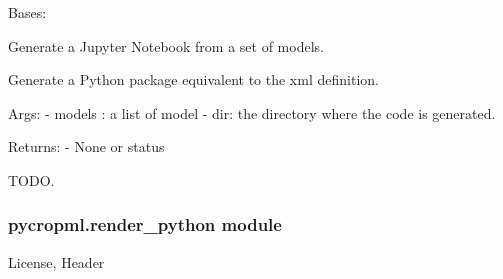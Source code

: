 \documentclass[letterpaper,10pt,english]{sphinxmanual}
\begin{document}
\begin{fulllineitems}
\label{\detokenize{_dvlpt/pycropml:pycropml.render_notebook.Model2Nb}}
Bases: {\hyperref[\detokenize{_dvlpt/pycropml:pycropml.render_python.Model2Package}]{}}

Generate a Jupyter Notebook from a set of models.

\begin{fulllineitems}
\label{\detokenize{_dvlpt/pycropml:pycropml.render_notebook.Model2Nb.generate_notebook}}
Generate a Python package equivalent to the xml definition.

Args:
- models : a list of model
- dir: the directory where the code is generated.

Returns:
- None or status

\end{fulllineitems}


\begin{fulllineitems}
\label{\detokenize{_dvlpt/pycropml:pycropml.render_notebook.Model2Nb.generate_test}}
\end{fulllineitems}


\begin{fulllineitems}
\label{\detokenize{_dvlpt/pycropml:pycropml.render_notebook.Model2Nb.run}}
TODO.

\end{fulllineitems}


\end{fulllineitems}



\subsubsection{pycropml.render\_python module}
\label{\detokenize{_dvlpt/pycropml:pycropml-render-python-module}}\label{\detokenize{_dvlpt/pycropml:module-pycropml.render_python}}
License, Header
\end{document}
